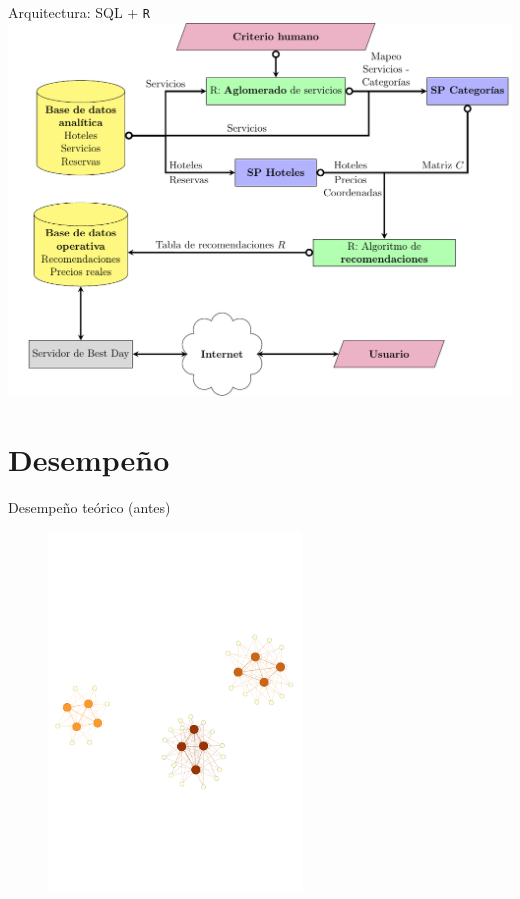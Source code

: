 \documentclass{beamer}
\begin{document}
\begin{frame}{Arquitectura: SQL + \texttt{R}}
	\includegraphics[width=\textwidth]{imagenes/flowchart.pdf}
\end{frame}

\section{Desempeño}

\begin{frame}{Desempeño teórico (antes)}
	\begin{figure}
		\centering
		\includegraphics[width=0.6\textwidth, clip = true, trim = 0 0 0 80]{imagenes/disconexo.pdf}
	\end{figure}
\end{frame}
\end{document}
